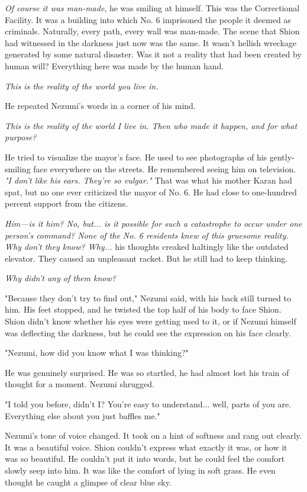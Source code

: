 \emph{Of course it was man-made}, he was smiling at himself. This was the
Correctional Facility. It was a building into which No. 6 imprisoned the
people it deemed as criminals. Naturally, every path, every wall was
man-made. The scene that Shion had witnessed in the darkness just now
was the same. It wasn't hellish wreckage generated by some natural
disaster. Was it not a reality that had been created by human will?
Everything here was made by the human hand.

\emph{This is the reality of the world you live in.}

He repeated Nezumi's words in a corner of his mind.

\emph{This is the reality of the world I live in. Then who made it happen, and
for what purpose?}

He tried to visualize the mayor's face. He used to see photographs of
his gently-smiling face everywhere on the streets. He remembered seeing
him on television. \emph{"I don't like his ears. They're so vulgar."} That was
what his mother Karan had spat, but no one ever criticized the mayor of
No. 6. He had close to one-hundred percent support from the citizens.

\emph{Him---is it him? No, but... is it possible for such a catastrophe to occur
under one person's command? None of the No. 6 residents knew of this
gruesome reality. Why don't they know? Why...} his thoughts creaked
haltingly like the outdated elevator. They caused an unpleasant racket.
But he still had to keep thinking.

\emph{Why didn't any of them know?}

"Because they don't try to find out," Nezumi said, with his back still
turned to him. His feet stopped, and he twisted the top half of his body
to face Shion. Shion didn't know whether his eyes were getting used to
it, or if Nezumi himself was deflecting the darkness, but he could see
the expression on his face clearly.

"Nezumi, how did you know what I was thinking?"

He was genuinely surprised. He was so startled, he had almost lost his
train of thought for a moment. Nezumi shrugged.

"I told you before, didn't I? You're easy to understand... well, parts
of you are. Everything else about you just baffles me."

Nezumi's tone of voice changed. It took on a hint of softness and rang
out clearly. It was a beautiful voice. Shion couldn't express what
exactly it was, or how it was so beautiful. He couldn't put it into
words, but he could feel the comfort slowly seep into him. It was like
the comfort of lying in soft grass. He even thought he caught a glimpse
of clear blue sky.

